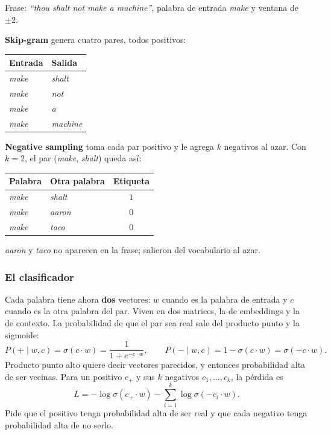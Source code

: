 \documentclass[11pt,letterpaper]{article}
\begin{document}
\begin{ejemplo}
    Frase: \textit{``thou shalt not make a machine''}, palabra de
    entrada \textit{make} y ventana de $\pm 2$.

    \textbf{Skip-gram} genera cuatro pares, todos positivos:
    \begin{center}
    \begin{tabular}{ll}
        \toprule
        \textbf{Entrada} & \textbf{Salida} \\
        \midrule
        \textit{make} & \textit{shalt} \\
        \textit{make} & \textit{not} \\
        \textit{make} & \textit{a} \\
        \textit{make} & \textit{machine} \\
        \bottomrule
    \end{tabular}
    \end{center}

    \textbf{Negative sampling} toma cada par positivo y le agrega $k$
    negativos al azar. Con $k = 2$, el par (\textit{make},
    \textit{shalt}) queda así:
    \begin{center}
    \begin{tabular}{llc}
        \toprule
        \textbf{Palabra} & \textbf{Otra palabra} & \textbf{Etiqueta} \\
        \midrule
        \textit{make} & \textit{shalt} & $1$ \\
        \textit{make} & \textit{aaron} & $0$ \\
        \textit{make} & \textit{taco}  & $0$ \\
        \bottomrule
    \end{tabular}
    \end{center}
    \textit{aaron} y \textit{taco} no aparecen en la frase; salieron
    del vocabulario al azar.
\end{ejemplo}

\subsubsection*{El clasificador}

Cada palabra tiene ahora \textbf{dos} vectores: $w$ cuando es la
palabra de entrada y $c$ cuando es la otra palabra del par. Viven en
dos matrices, la de embeddings y la de contexto. La probabilidad de
que el par sea real sale del producto punto y la sigmoide:
\[
    P(+ \mid w, c) = \sigma(c \cdot w) = \frac{1}{1 + e^{-c \cdot w}} ,
    \qquad
    P(- \mid w, c) = 1 - \sigma(c \cdot w) = \sigma(-c \cdot w) .
\]
Producto punto alto quiere decir vectores parecidos, y entonces
probabilidad alta de ser vecinas. Para un positivo $c_{+}$ y sus $k$
negativos $c_{1}, \ldots, c_{k}$, la pérdida es
\[
    L = -\log \sigma(c_{+} \cdot w)
        - \sum_{i=1}^{k} \log \sigma(-c_{i} \cdot w) .
\]
Pide que el positivo tenga probabilidad alta de ser real y que cada
negativo tenga probabilidad alta de no serlo.
\end{document}
